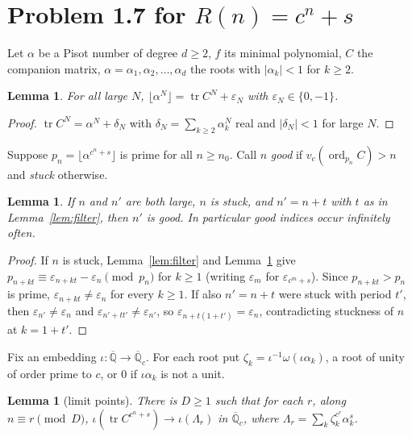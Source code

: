 \documentclass[11pt]{amsart}
\newtheorem{lemma}[theorem]{Lemma}
\theoremstyle{definition}
\newcommand{\Q}{\mathbb{Q}}
\newcommand{\Qbar}{\overline{\mathbb{Q}}}
\newcommand{\tr}{\operatorname{tr}}
\newcommand{\ord}{\operatorname{ord}}
\newcommand{\floor}[1]{\lfloor #1 \rfloor}
\begin{document}
\section{Problem 1.7 for $R(n)=c^n+s$}\label{sec:D}

Let $\alpha$ be a Pisot number of degree $d\ge2$, $f$ its minimal polynomial, $C$ the companion matrix, $\alpha=\alpha_1,\alpha_2,\dots,\alpha_d$ the roots with $|\alpha_k|<1$ for $k\ge2$.

\begin{lemma}\label{lem:floortrace}
For all large $N$, $\floor{\alpha^N}=\tr C^N+\varepsilon_N$ with $\varepsilon_N\in\{0,-1\}$.
\end{lemma}

\begin{proof}
$\tr C^N=\alpha^N+\delta_N$ with $\delta_N=\sum_{k\ge2}\alpha_k^N$ real and $|\delta_N|<1$ for large $N$.
\end{proof}

Suppose $p_n=\floor{\alpha^{c^n+s}}$ is prime for all $n\ge n_0$.  Call $n$ \emph{good} if $v_c(\ord_{p_n}C)>n$ and \emph{stuck} otherwise.

\begin{lemma}\label{lem:stuck}
If $n$ and $n'$ are both large, $n$ is stuck, and $n'=n+t$ with $t$ as in Lemma~\ref{lem:filter}, then $n'$ is good.  In particular good indices occur infinitely often.
\end{lemma}

\begin{proof}
If $n$ is stuck, Lemma~\ref{lem:filter} and Lemma~\ref{lem:floortrace} give $p_{n+kt}\equiv\varepsilon_{n+kt}-\varepsilon_n\pmod{p_n}$ for $k\ge1$ (writing $\varepsilon_m$ for $\varepsilon_{c^m+s}$).  Since $p_{n+kt}>p_n$ is prime, $\varepsilon_{n+kt}\neq\varepsilon_n$ for every $k\ge1$.  If also $n'=n+t$ were stuck with period $t'$, then $\varepsilon_{n'}\neq\varepsilon_n$ and $\varepsilon_{n'+tt'}\neq\varepsilon_{n'}$, so $\varepsilon_{n+t(1+t')}=\varepsilon_n$, contradicting stuckness of $n$ at $k=1+t'$.
\end{proof}

Fix an embedding $\iota:\Qbar\to\overline{\Q}_c$.  For each root put $\zeta_k=\iota^{-1}\omega(\iota\alpha_k)$, a root of unity of order prime to $c$, or $0$ if $\iota\alpha_k$ is not a unit.

\begin{lemma}[limit points]\label{lem:limit}
There is $D\ge1$ such that for each $r$, along $n\equiv r\pmod D$, $\iota(\tr C^{c^n+s})\to\iota(\Lambda_r)$ in $\overline{\Q}_c$, where $\Lambda_r=\sum_k\zeta_k^{c^r}\alpha_k^s$.
\end{lemma}
\end{document}
